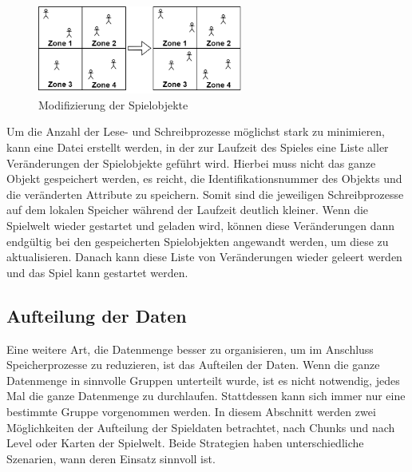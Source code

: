 \begin{figure}[htp]
    \centering
    \includegraphics[width=0.6\textwidth]{images/DeltaSave.png}
    \caption{Modifizierung der Spielobjekte}
    \label{fig:deltaSave}
\end{figure}

Um die Anzahl der Lese- und Schreibprozesse möglichst stark zu minimieren, kann eine Datei erstellt werden, in der zur Laufzeit des Spieles eine Liste aller Veränderungen der Spielobjekte geführt wird. Hierbei muss nicht das ganze Objekt gespeichert werden, es reicht, die Identifikationsnummer des Objekts und die veränderten Attribute zu speichern. Somit sind die jeweiligen Schreibprozesse auf dem lokalen Speicher während der Laufzeit deutlich kleiner. Wenn die Spielwelt wieder gestartet und geladen wird, können diese Veränderungen dann endgültig bei den gespeicherten Spielobjekten angewandt werden, um diese zu aktualisieren. Danach kann diese Liste von Veränderungen wieder geleert werden und das Spiel kann gestartet werden.


\subsection{Aufteilung der Daten} 
Eine weitere Art, die Datenmenge besser zu organisieren, um im Anschluss Speicherprozesse zu reduzieren, ist das Aufteilen der Daten. Wenn die ganze Datenmenge in sinnvolle Gruppen unterteilt wurde, ist es nicht notwendig, jedes Mal die ganze Datenmenge zu durchlaufen. Stattdessen kann sich immer nur eine bestimmte Gruppe vorgenommen werden. In diesem Abschnitt werden zwei Möglichkeiten der Aufteilung der Spieldaten betrachtet, nach Chunks und nach Level oder Karten der Spielwelt. Beide Strategien haben unterschiedliche Szenarien, wann deren Einsatz sinnvoll ist.

